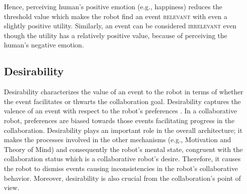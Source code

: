 Hence, perceiving human's positive emotion (e.g., happiness) reduces the
threshold value which makes the robot find an event \textsc{relevant} with even
a slightly positive utility. Similarly, an event can be considered
\textsc{irrelevant} even though the utility has a relatively positive value,
because of perceiving the human's negative emotion.

\subsection{Desirability}

Desirability characterizes the value of an event to the robot in terms of
whether the event facilitates or thwarts the collaboration goal. Desirability
captures the valence of an event with respect to the robot's preferences
\cite{gratch:domain-independent}. In a collaborative robot, preferences are
biased towards those events facilitating progress in the collaboration.
Desirability plays an important role in the overall architecture; it makes the
processes involved in the other mechanisms (e.g., Motivation and Theory of
Mind) and consequently the robot's mental state, congruent with the
collaboration status which is a collaborative robot's desire. Therefore, it
causes the robot to dismiss events causing inconsistencies in the robot's
collaborative behavior. Moreover, desirability is also crucial from the
collaboration's point of view.


